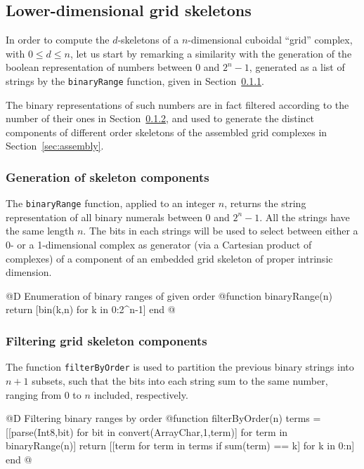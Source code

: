 \subsection{Lower-dimensional grid skeletons}

In order to compute the $d$-skeletons of a $n$-dimensional cuboidal ``grid'' complex, with $0\leq d\leq n$, let us start by remarking a similarity with the generation of the boolean representation of numbers between 0 and $2^n -1$, generated as a list of strings by the \texttt{binaryRange} function, given in Section~\ref{sec:binaryRange}.

The binary representations of such numbers are in fact filtered according to the number of their ones in Section~\ref{sec:filterByOrder}, and used to generate the distinct components of different order skeletons of the assembled grid complexes in Section~\ref{sec:assembly}.

\subsubsection{Generation of skeleton components}
\label{sec:binaryRange}

The \texttt{binaryRange} function, applied to an integer $n$, returns the string representation of all binary numerals between 0 and $2^n -1$. All the strings have the same length $n$. The bits in each strings will be used to select between either a 0- or a 1-dimensional complex as generator (via a Cartesian product of complexes) of a component of an embedded grid skeleton of proper intrinsic dimension.

@D Enumeration of binary ranges of given order
@{function binaryRange(n)
	return [bin(k,n) for k in 0:2^n-1]
end
@}



\subsubsection{Filtering grid skeleton components}
\label{sec:filterByOrder}

The function \texttt{filterByOrder} is used to partition the previous binary strings into $n+1$ subsets, such that the bits into each string sum to the same number, ranging from 0 to $n$ included, respectively.

@D Filtering binary ranges by order
@{function filterByOrder(n)
	terms = [[parse(Int8,bit) for bit in convert(Array{Char,1},term)] for term in binaryRange(n)]
	return [[term for term in terms if sum(term) == k] for k in 0:n]
end
@}




